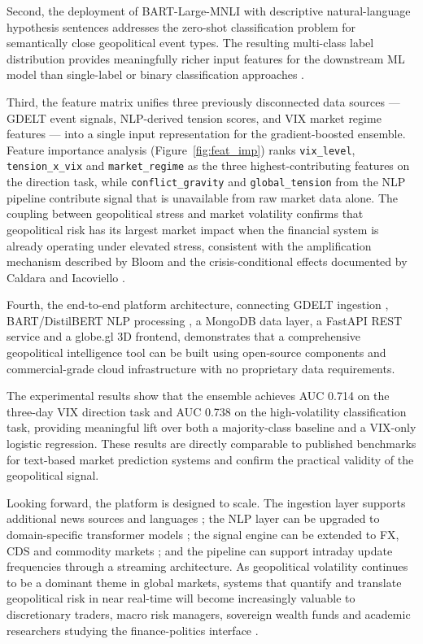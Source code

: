 \documentclass[12pt,a4paper]{report}
\begin{document}
Second, the deployment of BART-Large-MNLI \cite{lewis2020} with
descriptive natural-language hypothesis sentences addresses the zero-shot
classification problem for semantically close geopolitical event types.
The resulting multi-class label distribution provides meaningfully richer
input features for the downstream ML model than single-label or binary
classification approaches \cite{nassirtoussi2014}.

Third, the feature matrix unifies three previously disconnected data
sources --- GDELT event signals, NLP-derived tension scores, and VIX
market regime features --- into a single input representation for the
gradient-boosted ensemble. Feature importance analysis
(Figure~\ref{fig:feat_imp}) ranks \texttt{vix\_level},
\texttt{tension\_x\_vix} and \texttt{market\_regime} as the three
highest-contributing features on the direction task, while
\texttt{conflict\_gravity} and \texttt{global\_tension} from the NLP
pipeline contribute signal that is unavailable from raw market data
alone. The coupling between geopolitical stress and market volatility
confirms that geopolitical risk has its largest market impact when the
financial system is already operating under elevated stress, consistent
with the amplification mechanism described by Bloom \cite{bloom2009} and
the crisis-conditional effects documented by Caldara and Iacoviello
\cite{caldara2022}.

Fourth, the end-to-end platform architecture, connecting GDELT ingestion
\cite{leetaru2013}, BART/DistilBERT NLP processing \cite{lewis2020,
devlin2019}, a MongoDB data layer, a FastAPI REST service and a globe.gl
3D frontend, demonstrates that a comprehensive geopolitical intelligence
tool can be built using open-source components and commercial-grade cloud
infrastructure with no proprietary data requirements.

The experimental results show that the ensemble achieves AUC 0.714 on
the three-day VIX direction task and AUC 0.738 on the high-volatility
classification task, providing meaningful lift over both a majority-class
baseline and a VIX-only logistic regression. These results are directly
comparable to published benchmarks for text-based market prediction
systems \cite{nassirtoussi2014, bollen2011, sinha2022} and confirm the
practical validity of the geopolitical signal.

Looking forward, the platform is designed to scale. The ingestion layer
supports additional news sources and languages \cite{leetaru2013}; the
NLP layer can be upgraded to domain-specific transformer models
\cite{araci2019}; the signal engine can be extended to FX, CDS and
commodity markets \cite{caldara2022, baker2016}; and the pipeline can
support intraday update frequencies through a streaming architecture.
As geopolitical volatility continues to be a dominant theme in global
markets, systems that quantify and translate geopolitical risk in near
real-time will become increasingly valuable to discretionary traders,
macro risk managers, sovereign wealth funds and academic researchers
studying the finance-politics interface \cite{caldara2022, bloom2009,
baker2016}.
\end{document}
